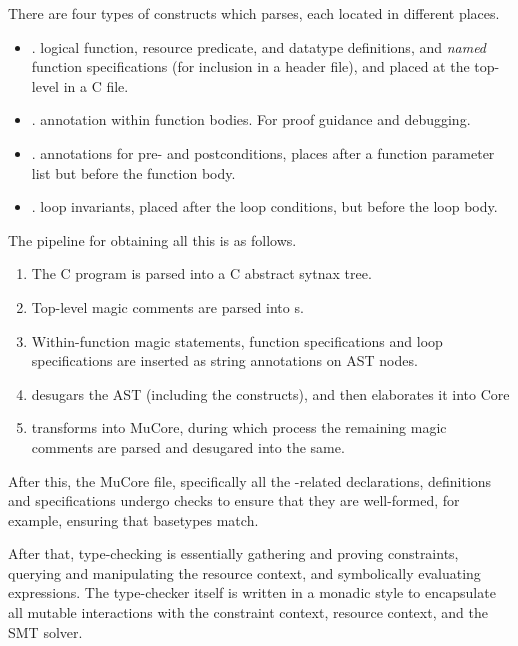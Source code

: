 There are four types of constructs which  parses, each located in
different places.
\begin{itemize}
    \item {}.  logical function, resource predicate,
        and datatype definitions, and \emph{named} function specifications (for
        inclusion in a header file), and placed at the top-level in a C file.
    \item {}.  annotation within function bodies.
        For proof guidance and debugging.
    \item {}.  annotations for pre- and
        postconditions, places after a function parameter list but before the
        function body.
    \item {}.  loop invariants, placed after the loop
        conditions, but before the loop body.
\end{itemize}

The pipeline for obtaining all this is as follows.
\begin{enumerate}
    \item The C program is parsed into a C abstract sytnax tree.
    \item Top-level magic comments are parsed into s.
    \item Within-function magic statements, function specifications and loop
        specifications are inserted as string annotations on AST nodes.
    \item {} desugars the AST (including the 
        constructs), and then elaborates it into Core
    \item {} transforms  into MuCore, during which process
        the remaining magic comments are parsed and desugared into the same.
\end{enumerate}

After this, the MuCore file, specifically all the -related
declarations, definitions and specifications undergo checks to ensure that they
are well-formed, for example, ensuring that basetypes match.

After that, type-checking is essentially gathering and proving constraints,
querying and manipulating the resource context, and symbolically evaluating
expressions. The type-checker itself is written in a monadic style to
encapsulate all mutable interactions with the constraint context, resource
context, and the SMT solver.

